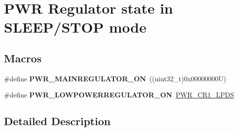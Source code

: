 \hypertarget{group___p_w_r___regulator__state__in___s_t_o_p__mode}{}\section{P\+WR Regulator state in S\+L\+E\+E\+P/\+S\+T\+OP mode}
\label{group___p_w_r___regulator__state__in___s_t_o_p__mode}
\subsection*{Macros}
\begin{DoxyCompactItemize}
\item 
\mbox{\label{group___p_w_r___regulator__state__in___s_t_o_p__mode_ga1d5b4e1482184286e28c16162f530039}} 
\#define {\bfseries P\+W\+R\+\_\+\+M\+A\+I\+N\+R\+E\+G\+U\+L\+A\+T\+O\+R\+\_\+\+ON}~((uint32\+\_\+t)0x00000000\+U)
\item 
\mbox{\label{group___p_w_r___regulator__state__in___s_t_o_p__mode_gab9922a15f8414818d736d5e7fcace963}} 
\#define {\bfseries P\+W\+R\+\_\+\+L\+O\+W\+P\+O\+W\+E\+R\+R\+E\+G\+U\+L\+A\+T\+O\+R\+\_\+\+ON}~\mbox{\hyperlink{group___peripheral___registers___bits___definition_gacc60f674740c4000a25b0e3e50ede47d}{P\+W\+R\+\_\+\+C\+R1\+\_\+\+L\+P\+DS}}
\end{DoxyCompactItemize}


\subsection{Detailed Description}
